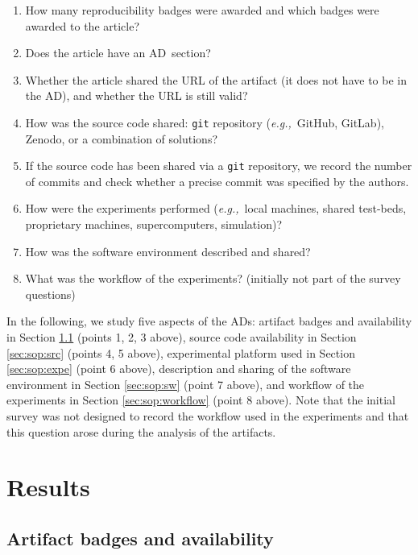 \documentclass[sigconf,natbib=false]{acmart}
\newcommand{\eg}{\emph{e.g.,}}
\newcommand{\ad}{AD}
\begin{document}

\begin{enumerate}
  \item How many reproducibility badges were awarded and which badges were awarded to the article?
  \item Does the article have an \ad\ section?
  \item Whether the article shared the URL of the artifact (it does not have to be in the \ad), and whether the URL is still valid?

  \item How was the source code shared: \texttt{git} repository (\eg\ GitHub, GitLab), Zenodo, or a combination of solutions?
  \item If the source code has been shared via a \texttt{git} repository, we record the number of commits and check whether a precise commit was specified by the authors.

  \item How were the experiments performed (\eg\ local machines, shared test-beds, proprietary machines, supercomputers, simulation)?

  \item How was the software environment described and shared?

  \item What was the workflow of the experiments? (initially not part of the survey questions)

\end{enumerate}

In the following, we study five aspects of the \ad s: 
artifact badges and availability in Section \ref{sec:sop:ad-badges} (points 1, 2, 3 above),
source code availability in Section \ref{sec:sop:src} (points 4, 5 above), 
experimental platform used in Section \ref{sec:sop:expe} (point 6 above), 
description and sharing of the software environment in Section \ref{sec:sop:sw} (point 7 above), and 
workflow of the experiments in Section \ref{sec:sop:workflow} (point 8 above). 
Note that the initial survey was not designed to record the workflow used in the experiments and that this question arose during the analysis of the artifacts. 

\section{Results}\label{sec:sop}

\subsection{Artifact badges and availability}\label{sec:sop:ad-badges}
\end{document}
